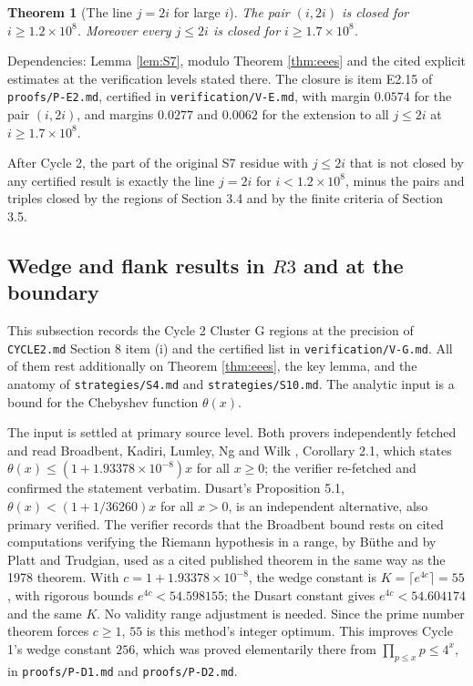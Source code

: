 \documentclass[11pt]{article}
\newtheorem{theorem}{Theorem}[section]
\theoremstyle{remark}
\begin{document}
\begin{theorem}[The line $j=2i$ for large $i$]
\label{thm:j2i}
The pair $(i,2i)$ is closed for $i\ge 1.2\times 10^8$. Moreover every $j\le 2i$ is closed for $i\ge 1.7\times 10^8$.
\end{theorem}

Dependencies: Lemma \ref{lem:S7}, modulo Theorem \ref{thm:eees} and the cited explicit estimates at the verification levels stated there. The closure is item E2.15 of \texttt{proofs/P-E2.md}, certified in \texttt{verification/V-E.md}, with margin $0.0574$ for the pair $(i,2i)$, and margins $0.0277$ and $0.0062$ for the extension to all $j\le 2i$ at $i\ge 1.7\times 10^8$.

After Cycle 2, the part of the original S7 residue with $j\le 2i$ that is not closed by any certified result is exactly the line $j=2i$ for $i<1.2\times 10^8$, minus the pairs and triples closed by the regions of Section 3.4 and by the finite criteria of Section 3.5.

\subsection{Wedge and flank results in $R3$ and at the boundary}

This subsection records the Cycle 2 Cluster G regions at the precision of \texttt{CYCLE2.md} Section 8 item (i) and the certified list in \texttt{verification/V-G.md}. All of them rest additionally on Theorem \ref{thm:eees}, the key lemma, and the anatomy of \texttt{strategies/S4.md} and \texttt{strategies/S10.md}. The analytic input is a bound for the Chebyshev function $\theta(x)$.

The input is settled at primary source level. Both provers independently fetched and read Broadbent, Kadiri, Lumley, Ng and Wilk \cite{Broadbent}, Corollary 2.1, which states $\theta(x)\le (1+1.93378\times 10^{-8})x$ for all $x\ge 0$; the verifier re-fetched and confirmed the statement verbatim. Dusart's Proposition 5.1, $\theta(x)<(1+1/36260)x$ for all $x>0$, is an independent alternative, also primary verified. The verifier records that the Broadbent bound rests on cited computations verifying the Riemann hypothesis in a range, by B\"uthe and by Platt and Trudgian, used as a cited published theorem in the same way as the 1978 theorem. With $c=1+1.93378\times 10^{-8}$, the wedge constant is $K=\lceil e^{4c}\rceil=55$, with rigorous bounds $e^{4c}<54.598155$; the Dusart constant gives $e^{4c}<54.604174$ and the same $K$. No validity range adjustment is needed. Since the prime number theorem forces $c\ge 1$, $55$ is this method's integer optimum. This improves Cycle 1's wedge constant $256$, which was proved elementarily there from $\prod_{p\le x}p\le 4^x$, in \texttt{proofs/P-D1.md} and \texttt{proofs/P-D2.md}.
\end{document}
